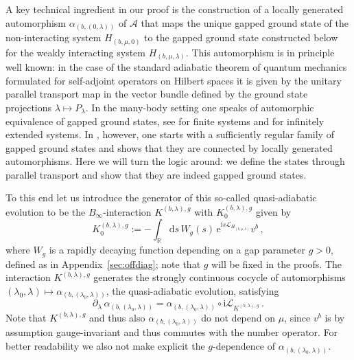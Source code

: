\documentclass[a4paper]{article}
\newcommand{\e}{\mathrm{e}}
\newcommand{\D}{\mathrm{d}}
\renewcommand{\i}{\mathrm{i}}
\newcommand{\mA}{\mathcal{A}}
\newcommand{\R}{\mathbb{R}}
\newcommand{\mL}{\mathcal{L}}
\theoremstyle{plain}
\theoremstyle{definition}
\theoremstyle{remark}
\renewcommand{\(}{\left(}
\renewcommand{\)}{\right)}
\begin{document}
 A key technical ingredient in our proof is the construction of a locally generated automorphism $\alpha_{(b,(0,\lambda))}$ of $\mA$ that  maps    the unique gapped ground state of the non-interacting system $H_{(b,\mu,0)}$   to the gapped ground state constructed below for the weakly interacting system  $H_{(b,\mu,\lambda)}$. This automorphism is in principle well known: in the case of the standard adiabatic theorem of quantum mechanics formulated for self-adjoint operators on Hilbert spaces it is given by the unitary parallel transport map in the vector bundle defined by the ground state projections $\lambda\mapsto P_\lambda$. In the many-body setting one speaks of automorphic equivalence of gapped ground states, see  \cite{BMNS12} for finite systems and \cite{MO20,BTW26automorphic} for infinitely extended systems. In \cite{MO20,BTW26automorphic}, however, one starts with a sufficiently regular family of gapped ground states and shows that they are connected by locally generated automorphisms. Here we will turn the logic around: we define the states through parallel transport and show that they are indeed gapped ground states.



To this end let us introduce the generator of this so-called quasi-adiabatic evolution   to be the $B_\infty$-interaction $K^{(b,\lambda),g}$ with $K^{(b,\lambda),g}_0$ given by 
\begin{equation}\label{KDef}
K^{(b,\lambda),g}_0  :=  -\int_\R \D s\, W_g(s)
\,\e^{\i s\mL_{H_{(b,\mu,\lambda)}}} v^b
\,,
\end{equation}
where $W_g$ is a rapidly decaying function depending on a gap parameter $g>0$, defined as in Appendix~\ref{sec:offdiag}; note that $g$ will be fixed in the proofs. The interaction
$K^{(b,\lambda),g}$ generates the strongly continuous cocycle of automorphisms
$(\lambda_0,\lambda)\mapsto \alpha_{(b,(\lambda_0, \lambda))}$, the quasi-adiabatic evolution,  satisfying
\[
\partial_\lambda \,\alpha_{(b,(\lambda_0, \lambda))} = \alpha_{(b,(\lambda_0, \lambda))} \circ \i \mL_{K^{(b,\lambda),g}}\,.
\]
Note that $K^{(b,\lambda),g}$ and thus also $\alpha_{(b,(\lambda_0, \lambda))}$ do not depend on $\mu$, since $v^b$ is by assumption gauge-invariant and thus   commutes with the number operator. For better readability we also not make explicit the $g$-dependence of $\alpha_{(b,(\lambda_0, \lambda))}$.
 
\end{document}
